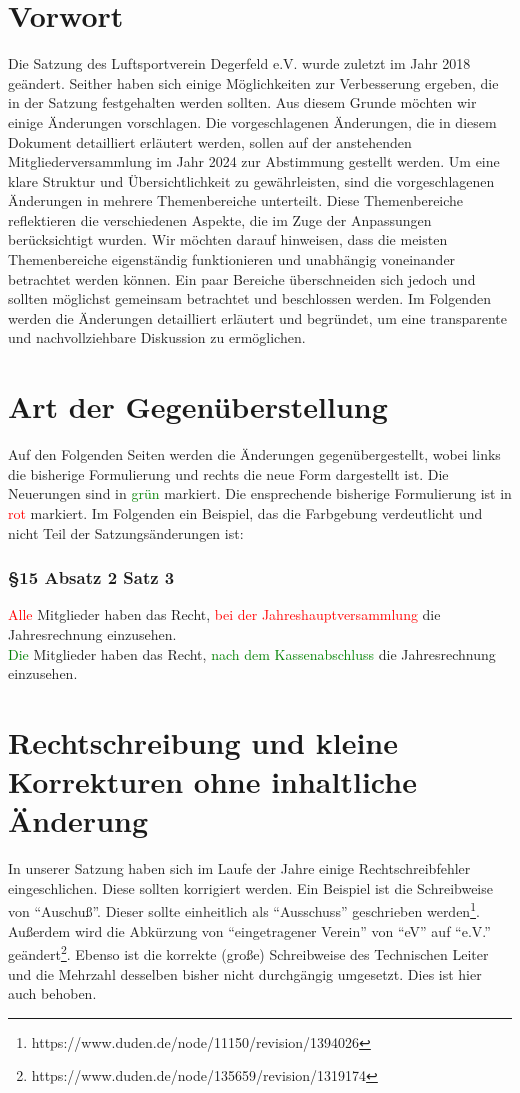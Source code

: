 \documentclass[10pt,a4paper,parskip=half]{scrartcl}
\newcommand{\new}[1]{\textcolor{Green}{#1}}
\newcommand{\old}[1]{\textcolor{Red}{#1}}
\newcommand{\change}[1]{
  \begin{adjustwidth}{20pt}{20pt}
    #1
  \end{adjustwidth}
}
\newcommand{\compare}[3]{\change{\subsubsection*{#1}\begin{multicols}{2}#2\columnbreak\\#3\end{multicols}}}
\begin{document}
\clearpage


\section*{Vorwort}
Die Satzung des Luftsportverein Degerfeld e.V. wurde zuletzt im Jahr 2018 geändert. Seither haben sich einige Möglichkeiten zur Verbesserung ergeben, die in der Satzung festgehalten werden sollten. Aus diesem Grunde möchten wir einige Änderungen vorschlagen. Die vorgeschlagenen Änderungen, die in diesem Dokument detailliert erläutert werden, sollen auf der anstehenden Mitgliederversammlung im Jahr 2024 zur Abstimmung gestellt werden. Um eine klare Struktur und Übersichtlichkeit zu gewährleisten, sind die vorgeschlagenen Änderungen in mehrere Themenbereiche unterteilt. Diese Themenbereiche reflektieren die verschiedenen Aspekte, die im Zuge der Anpassungen berücksichtigt wurden. Wir möchten darauf hinweisen, dass die meisten Themenbereiche eigenständig funktionieren und unabhängig voneinander betrachtet werden können. Ein paar Bereiche überschneiden sich jedoch und sollten möglichst gemeinsam betrachtet und beschlossen werden. Im Folgenden werden die Änderungen detailliert erläutert und begründet, um eine transparente und nachvollziehbare Diskussion zu ermöglichen.


\tableofcontents
\clearpage

\section*{Art der Gegenüberstellung}

   Auf den Folgenden Seiten werden die Änderungen gegenübergestellt, wobei links die bisherige Formulierung und rechts die neue Form dargestellt ist. Die Neuerungen sind in \new{grün} markiert. Die ensprechende bisherige Formulierung ist in \old{rot} markiert. Im Folgenden ein Beispiel, das die Farbgebung verdeutlicht und nicht Teil der Satzungsänderungen ist:

  \compare{§15 Absatz 2 Satz 3}
  {\old{Alle} Mitglieder haben das Recht, \old{bei der Jahreshauptversammlung} die Jahresrechnung einzusehen.}
  {\new{Die} Mitglieder haben das Recht, \new{nach dem Kassenabschluss} die Jahresrechnung einzusehen.}


  \section{Rechtschreibung und kleine Korrekturen ohne inhaltliche Änderung}
  In unserer Satzung haben sich im Laufe der Jahre einige Rechtschreibfehler eingeschlichen. Diese sollten korrigiert werden.
  Ein Beispiel ist die Schreibweise von "`Auschuß"'. Dieser sollte einheitlich als "`Ausschuss"' geschrieben werden\footnote{https://www.duden.de/node/11150/revision/1394026}.
  Außerdem wird die Abkürzung von "`eingetragener Verein"' von "`eV"' auf "`e.V."' geändert\footnote{https://www.duden.de/node/135659/revision/1319174}.
  Ebenso ist die korrekte (große) Schreibweise des Technischen Leiter und die Mehrzahl desselben bisher nicht durchgängig umgesetzt. Dies ist hier auch behoben.
\end{document}
